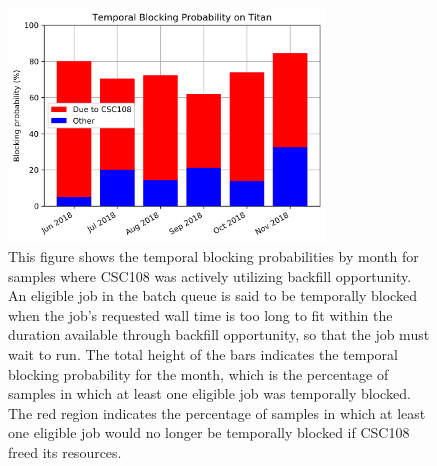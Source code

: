 \begin{figure}
  \includegraphics[width=0.75\textwidth]{images/barplot-temporal-blocking-by-month.png}
\caption{This figure shows the temporal blocking probabilities by month for
samples where CSC108 was actively utilizing backfill opportunity. An eligible
job in the batch queue is said to be temporally blocked when the job's
requested wall time is too long to fit within the duration available through
backfill opportunity, so that the job must wait to run. The total height of the
bars indicates the temporal blocking probability for the month, which is the
percentage of samples in which at least one eligible job was temporally
blocked. The red region indicates the percentage of samples in which at least
one eligible job would no longer be temporally blocked if CSC108 freed its
resources.}
\label{fig:temporal-blocking-by-month}
\end{figure}


